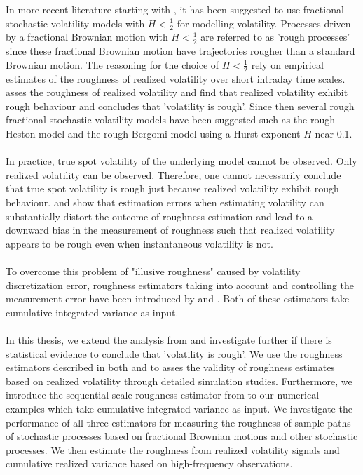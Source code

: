 \documentclass{article}
\begin{document}
In more recent literature starting with \cite{gatheral}, it has been suggested to use fractional stochastic volatility models with $H<\frac{1}{2}$ for modelling volatility. Processes driven by a fractional Brownian motion with $H<\frac{1}{2}$ are referred to as 'rough processes' since these fractional Brownian motion have trajectories rougher than a standard Brownian motion. The reasoning for the choice of $H<\frac{1}{2}$ rely on empirical estimates of the roughness of realized volatility over short intraday time scales. \cite{gatheral} asses the roughness of realized volatility and find that realized volatility exhibit rough behaviour and concludes that 'volatility is rough'. Since then several rough fractional stochastic volatility models have been suggested such as the rough Heston model \cite{el2019} and the rough Bergomi model \cite{bayer2016} using a Hurst exponent $H$ near 0.1. \\\\
In practice, true spot volatility of the underlying model cannot be observed. Only realized volatility can be observed. Therefore, one cannot necessarily conclude that true spot volatility is rough just because realized volatility exhibit rough behaviour. \cite{fukasawa} and \cite{cont} show that estimation errors when estimating volatility can substantially distort the outcome of roughness estimation and lead to a downward bias in the measurement of roughness such that realized volatility appears to be rough even when instantaneous volatility is not. \\\\
To overcome this problem of "illusive roughness" caused by volatility discretization error, roughness estimators taking into account and controlling the measurement error have been introduced by \cite{han} and \cite{bolko2023}. Both of these estimators take cumulative integrated variance as input. \\\\
In this thesis, we extend the analysis from \cite{cont} and investigate further if there is statistical evidence to conclude that 'volatility is rough'. We use the roughness estimators described in both \cite{cont} and \cite{gatheral} to asses the validity of roughness estimates based on realized volatility through detailed simulation studies. Furthermore, we introduce the sequential scale roughness estimator from \cite{han} to our numerical examples which take cumulative integrated variance as input. We investigate the performance of all three estimators for measuring the roughness of sample paths of stochastic processes based on fractional Brownian motions and other stochastic processes. We then estimate the roughness from realized volatility signals and cumulative realized variance based on high-frequency observations.\\\\
\end{document}
